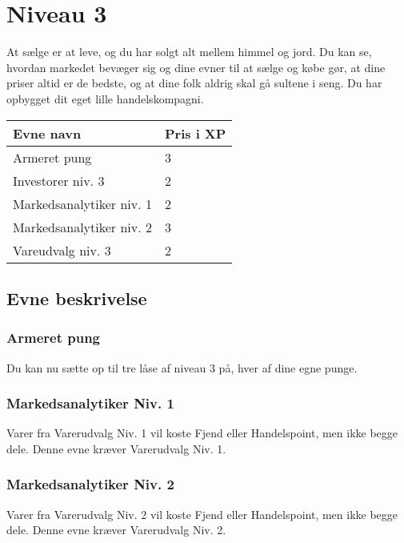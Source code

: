 \chapter{Niveau 3}

At sælge er at leve, og du har solgt alt mellem himmel og jord. Du kan se, hvordan markedet bevæger sig og dine evner til at sælge og købe gør, at dine priser altid er de bedste, og at dine folk aldrig skal gå sultene i seng. Du har opbygget dit eget lille handelskompagni. 

\begin{table}[H]
    \centering
    \begin{tabular}{|p{}|p{}|}
    \rowcolor{cerulean!80}\hline
        Evne navn & Pris i XP \\\hline
        Armeret pung & 3\\\hline
        Investorer niv. 3& 2\\\hline
        Markedsanalytiker niv. 1& 2\\\hline
        Markedsanalytiker niv. 2& 3\\\hline
        Vareudvalg niv. 3& 2\\\hline
    \end{tabular}
\end{table}
\section{Evne beskrivelse}

\subsection{Armeret pung}
Du kan nu sætte op til tre låse af niveau 3 på, hver af dine egne punge.\\



\subsection{Markedsanalytiker Niv. 1}
Varer fra Varerudvalg Niv. 1 vil koste Fjend eller Handelspoint, men ikke begge dele. Denne evne kræver Varerudvalg Niv. 1.\\

\subsection{Markedsanalytiker Niv. 2}
Varer fra Varerudvalg Niv. 2 vil koste Fjend eller Handelspoint, men ikke begge dele. Denne evne kræver Varerudvalg Niv. 2.\\

